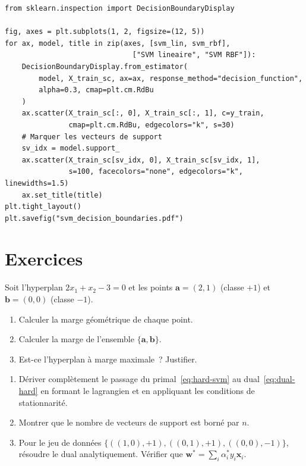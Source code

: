 \begin{codeblock}[title=\textbf{Fronti\`ere de d\'ecision SVM lin\'eaire vs RBF}]
\begin{verbatim}
from sklearn.inspection import DecisionBoundaryDisplay

fig, axes = plt.subplots(1, 2, figsize=(12, 5))
for ax, model, title in zip(axes, [svm_lin, svm_rbf],
                              ["SVM lineaire", "SVM RBF"]):
    DecisionBoundaryDisplay.from_estimator(
        model, X_train_sc, ax=ax, response_method="decision_function",
        alpha=0.3, cmap=plt.cm.RdBu
    )
    ax.scatter(X_train_sc[:, 0], X_train_sc[:, 1], c=y_train,
               cmap=plt.cm.RdBu, edgecolors="k", s=30)
    # Marquer les vecteurs de support
    sv_idx = model.support_
    ax.scatter(X_train_sc[sv_idx, 0], X_train_sc[sv_idx, 1],
               s=100, facecolors="none", edgecolors="k", linewidths=1.5)
    ax.set_title(title)
plt.tight_layout()
plt.savefig("svm_decision_boundaries.pdf")
\end{verbatim}
\end{codeblock}

\section{Exercices}
\label{sec:exercises-ch5}

\begin{exercice}
Soit l'hyperplan $2x_1 + x_2 - 3 = 0$ et les points $\bm{a} = (2, 1)$ (classe
$+1$) et $\bm{b} = (0, 0)$ (classe $-1$).
\begin{enumerate}
  \item Calculer la marge g\'eom\'etrique de chaque point.
  \item Calculer la marge de l'ensemble $\{\bm{a}, \bm{b}\}$.
  \item Est-ce l'hyperplan \`a marge maximale~? Justifier.
\end{enumerate}
\end{exercice}

\begin{exercice}
\begin{enumerate}
  \item D\'eriver compl\`etement le passage du primal~\eqref{eq:hard-svm} au
    dual~\eqref{eq:dual-hard} en formant le lagrangien et en appliquant les
    conditions de stationnarit\'e.
  \item Montrer que le nombre de vecteurs de support est born\'e par $n$.
  \item Pour le jeu de donn\'ees $\{((1,0), +1), ((0,1), +1),
    ((0,0), -1)\}$, r\'esoudre le dual analytiquement. V\'erifier que
    $\bm{w}^* = \sum_i \alpha_i^* y_i \bm{x}_i$.
\end{enumerate}
\end{exercice}

